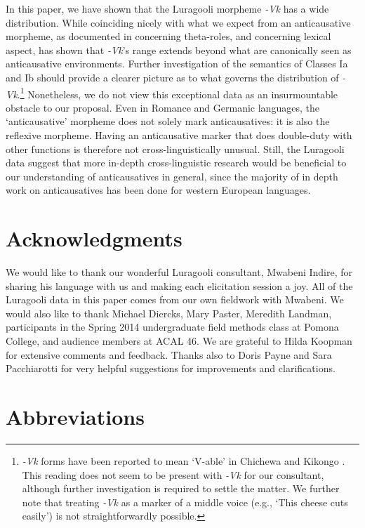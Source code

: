 \documentclass[output=paper]{langsci/lanmgscibook}
\begin{document}
In this paper, we have shown that the Luragooli morpheme \textit{-Vk} has a wide distribution. While coinciding nicely with what we expect from an anticausative morpheme, as documented in  concerning theta-roles, and  concerning lexical aspect,  has shown that \textit{-Vk}’s range extends beyond what are canonically seen as anticausative environments. Further investigation of the semantics of Classes Ia and Ib should provide a clearer picture as to what governs the distribution of \textit{-Vk}.\footnote{\textit{-Vk} forms have been reported to mean ‘V-able’ in Chichewa \citep{Simango2009} and Kikongo \citep{Fernando2013}. This reading does not seem to be present with \textit{-Vk} for our consultant, although further investigation is required to settle the matter. We further note that treating \textit{-Vk} as a marker of a middle voice (e.g., ‘This cheese cuts easily’) is not straightforwardly possible.} Nonetheless, we do not view this exceptional data as an insurmountable obstacle to our proposal. Even in Romance and Germanic languages, the ‘anticausative’ morpheme does not solely mark anticausatives: it is also the reflexive morpheme. Having an anticausative marker that does double-duty with other functions is therefore not cross-linguistically unusual. Still, the Luragooli data suggest that more in-depth cross-linguistic research would be beneficial to our understanding of anticausatives in general, since the majority of in depth work on anticausatives has been done for western European languages.

\section*{Acknowledgments}

We would like to thank our wonderful Luragooli consultant, Mwabeni Indire, for sharing his language with us and making each elicitation session a joy. All of the Luragooli data in this paper comes from our own fieldwork with Mwabeni. We would also like to thank Michael Diercks, Mary Paster, Meredith Landman, participants in the Spring 2014 undergraduate field methods class at Pomona College, and audience members at ACAL 46. We are grateful to Hilda Koopman for extensive comments and feedback. Thanks also to Doris Payne and Sara Pacchiarotti for very helpful suggestions for improvements and clarifications.

\section*{Abbreviations}
\end{document}

